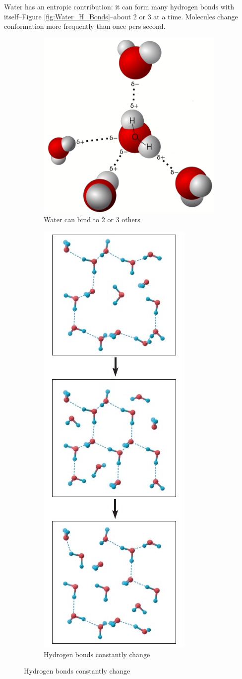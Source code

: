 \documentclass[]{article}
\begin{document}
Water has an entropic contribution: it can form many hydrogen bonds	with itself--Figure \ref{fig:Water_H_Bonds}--about 2 or 3 at a time. Molecules change conformation more frequently than once pers second.
\begin{figure}[H]
	\centering
	\caption{Water can form many hydrogen bonds	with itself} \label{fig:Water_H_Bonds} 
	\begin{subfigure}{.66\textwidth}
		\centering
		\includegraphics[width=.4\linewidth]{Water_H_Bonds}
		\caption{Water can bind to 2 or 3 others}
		\label{fig:sub1a}
	\end{subfigure}%
	\begin{subfigure}{.33\textwidth}
		\centering
		\includegraphics[width=.4\linewidth]{Water_H_Bonds_structure.jpg}
		\caption{Hydrogen bonds constantly change}
		\label{fig:sub2a}
	\end{subfigure}
\end{figure}
\end{document}
